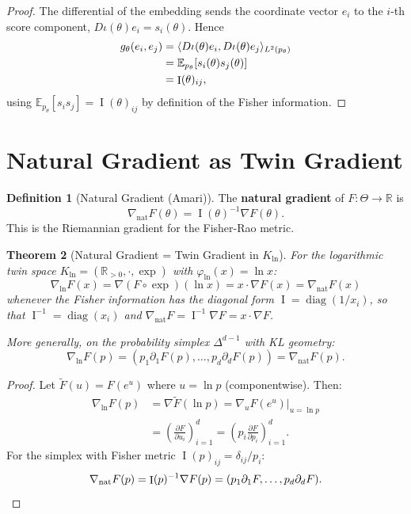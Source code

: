 \documentclass[11pt,twoside]{book}
\theoremstyle{plain}
\newtheorem{theorem}{Theorem}[chapter]
\theoremstyle{definition}
\newtheorem{definition}[theorem]{Definition}
\theoremstyle{remark}
\newcommand{\R}{\mathbb{R}}
\newcommand{\E}{\mathbb{E}}
\newcommand{\Kln}{K_{\ln}}
\DeclareMathOperator{\diag}{diag}
\DeclareMathOperator{\Fisher}{I}
\newcommand{\pp}[2]{\frac{\partial #1}{\partial #2}}
\newcommand{\nabnat}{\nabla_{\mathrm{nat}}}
\newcommand{\simplex}{\Delta}
\newcommand{\Rpos}{\R_{>0}}
\begin{document}
\begin{proof}
    The differential of the embedding sends the coordinate vector $e_i$ to the
    $i$-th score component, $D\iota(\theta) e_i = s_i(\theta)$. Hence
    \begin{align}
        g_\theta(e_i, e_j) &= \langle D\iota(\theta) e_i, D\iota(\theta) e_j \rangle_{L^2(p_\theta)} \\
        &= \E_{p_\theta}[s_i(\theta) s_j(\theta)] \\
        &= \Fisher(\theta)_{ij}, \qedhere
    \end{align}
    using $\E_{p_\theta}[s_i s_j] = \Fisher(\theta)_{ij}$ by definition of the
    Fisher information.
\end{proof}

\section{Natural Gradient as Twin Gradient}
\label{sec:natural_gradient}

\begin{definition}[Natural Gradient (Amari)]
    The \textbf{natural gradient} of $F : \Theta \to \R$ is
    \[
    \nabnat F(\theta) = \Fisher(\theta)^{-1} \nabla F(\theta).
    \]
    This is the Riemannian gradient for the Fisher-Rao metric.
\end{definition}

\begin{theorem}[Natural Gradient = Twin Gradient in $\Kln$]
    \label{thm:natural_twin}
    For the logarithmic twin space $\Kln = (\Rpos, \cdot, \exp)$ with $\varphi_{\ln}(x) = \ln x$:
    \[
    \nabla_{\ln} F(x) = \nabla(F \circ \exp)(\ln x) = x \cdot \nabla F(x) = \nabnat F(x)
    \]
    whenever the Fisher information has the diagonal form $\Fisher = \diag(1/x_i)$,
    so that $\Fisher^{-1} = \diag(x_i)$ and $\nabnat F = \Fisher^{-1}\nabla F = x \cdot \nabla F$.
    
    More generally, on the probability simplex $\simplex^{d-1}$ with KL geometry:
    \[
    \nabla_{\ln} F(p) = (p_1 \partial_1 F(p), \ldots, p_d \partial_d F(p)) = \nabnat F(p).
    \]
\end{theorem}

\begin{proof}
    Let $\tilde{F}(u) = F(e^u)$ where $u = \ln p$ (componentwise). Then:
    \begin{align}
        \nabla_{\ln} F(p) &= \nabla \tilde{F}(\ln p) = \nabla_u F(e^u)\big|_{u=\ln p} \\
        &= \left(\pp{F}{u_i}\right)_{i=1}^d = \left(p_i \pp{F}{p_i}\right)_{i=1}^d.
    \end{align}
    For the simplex with Fisher metric $\Fisher(p)_{ij} = \delta_{ij}/p_i$:
    \[
    \nabnat F(p) = \Fisher(p)^{-1} \nabla F(p) = (p_1 \partial_1 F, \ldots, p_d \partial_d F). \qedhere
    \]
\end{proof}
\end{document}
